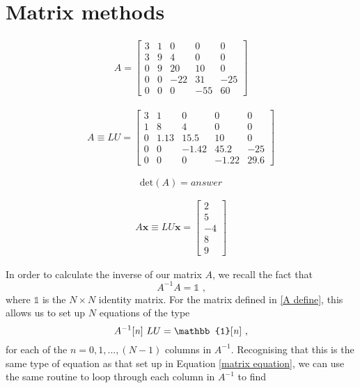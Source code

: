 \documentclass[paper=a4, fontsize=11pt]{scrartcl}
\begin{document}
\section{Matrix methods}

\begin{align}
\label{A define}
	A = 
	\begin{bmatrix}
	3 & 1 & 0 & 0 & 0 \\
  	3 & 9 & 4 & 0 & 0 \\
  	0 & 9 & 20 & 10 & 0 \\
  	0 & 0 & -22 & 31 & -25 \\
  	0 & 0 & 0 & -55 & 60
	\end{bmatrix}
\end{align}

\begin{align}	
	A \equiv LU =
		\begin{bmatrix}
	3 & 1 & 0 & 0 & 0 \\
	1 & 8 & 4 & 0 & 0 \\
	0 & 1.13 & 15.5 & 10 & 0 \\
	0 & 0 & -1.42 & 45.2 & -25 \\
	0 & 0 & 0 & -1.22 & 29.6
	\end{bmatrix}
\end{align}

\begin{equation}
\text{det}(A) = answer
\end{equation}

\begin{align}
\label{matrix equation}
A \textbf{x} \equiv LU \textbf{x} = 
	\begin{bmatrix}
	2 \\
	5 \\
	-4 \\
	8 \\
	9
	\end{bmatrix}
\end{align}

In order to calculate the inverse of our matrix $A$, we recall the fact that
\begin{equation}
A^{-1} A = \mathbb{1} \text{ ,}
\end{equation}
where $\mathbb{1}$ is the $N \times N$ identity matrix. For the matrix defined in \ref{A define}, this allows us to set up $N$ equations of the type
\begin{equation}
A^{-1}\text{[\textit{n}] } LU = \mathbb{1}\text{[\textit{n}]} \text{ ,}
\end{equation}
for each of the $n = 0, 1, ... , (N-1)$ columns in $A^{-1}$. Recognising that this is the same type of equation as that set up in Equation \ref{matrix equation}, we can use the same routine to loop through each column in $A^{-1}$ to find 
\end{document}
